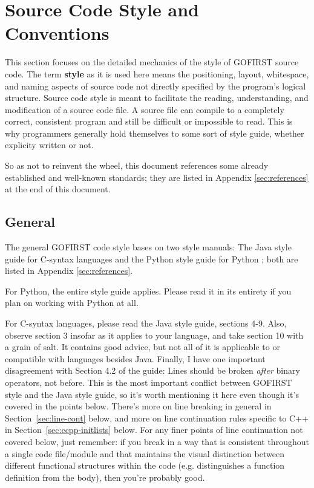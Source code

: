 \documentclass[12pt]{article}
\newcommand{\textdef}[1]{\textbf{#1}}
\begin{document}
\section{Source Code Style and Conventions}
\label{sec:codestyle}
This section focuses on the detailed mechanics of the style of GOFIRST source code. The term \textdef{style} as it is used here means the positioning, layout, whitespace, and naming aspects of source code not directly specified by the program's logical structure. Source code style is meant to facilitate the reading, understanding, and modification of a source code file. A source file can compile to a completely correct, consistent program and still be difficult or impossible to read. This is why programmers generally hold themselves to some sort of style guide, whether explicity written or not.

So as not to reinvent the wheel, this document references some already established and well-known standards; they are listed in Appendix \ref{sec:references} at the end of this document.

\subsection{General}
The general GOFIRST code style bases on two style manuals: The Java style guide for C-syntax languages \cite{javacon} and the Python style guide for Python \cite{pyguide}; both are listed in Appendix \ref{sec:references}.

For Python, the entire style guide applies. Please read it in its entirety if you plan on working with Python at all.

For C-syntax languages, please read the Java style guide, sections 4-9. Also, observe section 3 insofar as it applies to your language, and take section 10 with a grain of salt. It contains good advice, but not all of it is applicable to or compatible with languages besides Java. Finally, I have one important disagreement with Section 4.2 of the guide: Lines should be broken \emph{after} binary operators, not before. This is the most important conflict between GOFIRST style and the Java style guide, so it's worth mentioning it here even though it's covered in the points below. There's more on line breaking in general in Section~\ref{sec:line-cont} below, and more on line continuation rules specific to C++ in Section~\ref{sec:ccpp-initlists} below. For any finer points of line continuation not covered below, just remember: if you break in a way that is consistent throughout a single code file/module and that maintains the visual distinction between different functional structures within the code (e.g. distinguishes a function definition from the body), then you're probably good.
\end{document}
